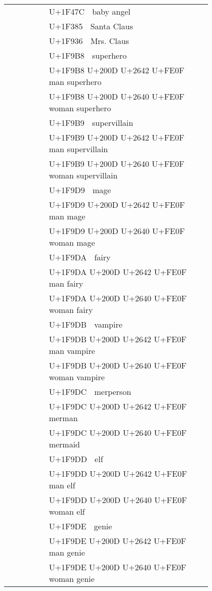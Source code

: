 \documentclass[a4paper,12pt]{ltjarticle}
\newcommand{\fontA}[1]{{\fontspec[RawFeature={mode=harf,dist,ccmp}]{Segoe UI Emoji} #1}}
\newcommand{\fontB}[1]{{\fontspec[RawFeature={mode=harf,dist,ccmp}]{Noto Color Emoji} #1}}
\begin{document}
\begin{longtable}[c]{ccp{0.8\linewidth}}
\fontA{👼}&\fontB{👼}&U+1F47C 👼 baby angel\\
\fontA{🎅}&\fontB{🎅}&U+1F385 🎅 Santa Claus\\
\fontA{🤶}&\fontB{🤶}&U+1F936 🤶 Mrs. Claus\\
\fontA{🦸}&\fontB{🦸}&U+1F9B8 🦸 superhero\\
\fontA{🦸‍♂️}&\fontB{🦸‍♂️}&U+1F9B8 U+200D U+2642 U+FE0F 🦸‍♂️ man superhero\\
\fontA{🦸‍♀️}&\fontB{🦸‍♀️}&U+1F9B8 U+200D U+2640 U+FE0F 🦸‍♀️ woman superhero\\
\fontA{🦹}&\fontB{🦹}&U+1F9B9 🦹 supervillain\\
\fontA{🦹‍♂️}&\fontB{🦹‍♂️}&U+1F9B9 U+200D U+2642 U+FE0F 🦹‍♂️ man supervillain\\
\fontA{🦹‍♀️}&\fontB{🦹‍♀️}&U+1F9B9 U+200D U+2640 U+FE0F 🦹‍♀️ woman supervillain\\
\fontA{🧙}&\fontB{🧙}&U+1F9D9 🧙 mage\\
\fontA{🧙‍♂️}&\fontB{🧙‍♂️}&U+1F9D9 U+200D U+2642 U+FE0F 🧙‍♂️ man mage\\
\fontA{🧙‍♀️}&\fontB{🧙‍♀️}&U+1F9D9 U+200D U+2640 U+FE0F 🧙‍♀️ woman mage\\
\fontA{🧚}&\fontB{🧚}&U+1F9DA 🧚 fairy\\
\fontA{🧚‍♂️}&\fontB{🧚‍♂️}&U+1F9DA U+200D U+2642 U+FE0F 🧚‍♂️ man fairy\\
\fontA{🧚‍♀️}&\fontB{🧚‍♀️}&U+1F9DA U+200D U+2640 U+FE0F 🧚‍♀️ woman fairy\\
\fontA{🧛}&\fontB{🧛}&U+1F9DB 🧛 vampire\\
\fontA{🧛‍♂️}&\fontB{🧛‍♂️}&U+1F9DB U+200D U+2642 U+FE0F 🧛‍♂️ man vampire\\
\fontA{🧛‍♀️}&\fontB{🧛‍♀️}&U+1F9DB U+200D U+2640 U+FE0F 🧛‍♀️ woman vampire\\
\fontA{🧜}&\fontB{🧜}&U+1F9DC 🧜 merperson\\
\fontA{🧜‍♂️}&\fontB{🧜‍♂️}&U+1F9DC U+200D U+2642 U+FE0F 🧜‍♂️ merman\\
\fontA{🧜‍♀️}&\fontB{🧜‍♀️}&U+1F9DC U+200D U+2640 U+FE0F 🧜‍♀️ mermaid\\
\fontA{🧝}&\fontB{🧝}&U+1F9DD 🧝 elf\\
\fontA{🧝‍♂️}&\fontB{🧝‍♂️}&U+1F9DD U+200D U+2642 U+FE0F 🧝‍♂️ man elf\\
\fontA{🧝‍♀️}&\fontB{🧝‍♀️}&U+1F9DD U+200D U+2640 U+FE0F 🧝‍♀️ woman elf\\
\fontA{🧞}&\fontB{🧞}&U+1F9DE 🧞 genie\\
\fontA{🧞‍♂️}&\fontB{🧞‍♂️}&U+1F9DE U+200D U+2642 U+FE0F 🧞‍♂️ man genie\\
\fontA{🧞‍♀️}&\fontB{🧞‍♀️}&U+1F9DE U+200D U+2640 U+FE0F 🧞‍♀️ woman genie\\

\end{longtable}
\end{document}
